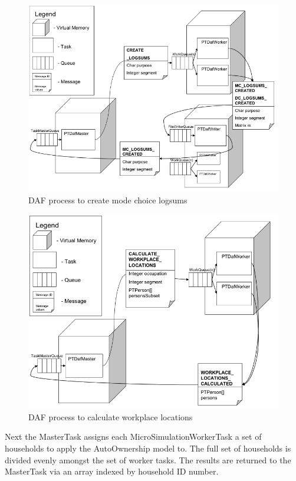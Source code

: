 \begin{figure}
\centering
\includegraphics[width=5in]{pt/figure75}
\caption{DAF process to create mode choice logsums}
\label{fig:daf-mc-logsums}
\end{figure}

\begin{figure}
\centering
\includegraphics[width=5in]{pt/figure76}
\caption{DAF process to calculate workplace locations}
\label{fig:daf-workplace-location}
\end{figure}

Next the MasterTask assigns each MicroSimulationWorkerTask a set of households to apply the AutoOwnership model to. The full set of households is divided evenly amongst the set of worker tasks. The results are returned to the MasterTask via an array indexed by household ID number. 

